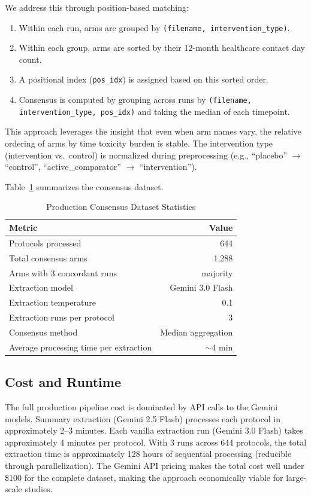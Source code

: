 \documentclass[11pt]{article}
\begin{document}
We address this through position-based matching:
\begin{enumerate}[leftmargin=*]
    \item Within each run, arms are grouped by \texttt{(filename, intervention\_type)}.
    \item Within each group, arms are sorted by their 12-month healthcare contact day count.
    \item A positional index (\texttt{pos\_idx}) is assigned based on this sorted order.
    \item Consensus is computed by grouping across runs by \texttt{(filename, intervention\_type, pos\_idx)} and taking the median of each timepoint.
\end{enumerate}

This approach leverages the insight that even when arm names vary, the relative ordering of arms by time toxicity burden is stable. The intervention type (intervention vs.\ control) is normalized during preprocessing (e.g., ``placebo'' $\to$ ``control'', ``active\_comparator'' $\to$ ``intervention'').

Table~\ref{tab:consensus_stats} summarizes the consensus dataset.

\begin{table}[H]
\centering
\caption{Production Consensus Dataset Statistics}
\label{tab:consensus_stats}
\begin{tabular}{lr}
\toprule
\textbf{Metric} & \textbf{Value} \\
\midrule
Protocols processed & 644 \\
Total consensus arms & 1,288 \\
Arms with 3 concordant runs & majority \\
Extraction model & Gemini 3.0 Flash \\
Extraction temperature & 0.1 \\
Extraction runs per protocol & 3 \\
Consensus method & Median aggregation \\
Average processing time per extraction & $\sim$4 min \\
\bottomrule
\end{tabular}
\end{table}

\subsection{Cost and Runtime}

The full production pipeline cost is dominated by API calls to the Gemini models. Summary extraction (Gemini 2.5 Flash) processes each protocol in approximately 2--3 minutes. Each vanilla extraction run (Gemini 3.0 Flash) takes approximately 4 minutes per protocol. With 3 runs across 644 protocols, the total extraction time is approximately 128 hours of sequential processing (reducible through parallelization). The Gemini API pricing makes the total cost well under \$100 for the complete dataset, making the approach economically viable for large-scale studies.
\end{document}

